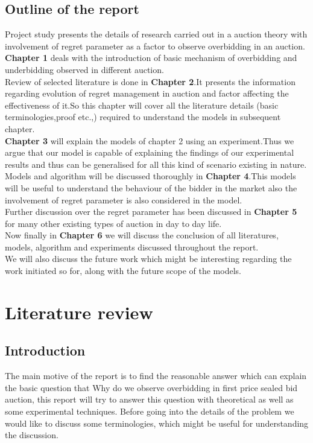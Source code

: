 \documentclass[10pt,a4paper,oneside]{report}
\begin{document}
\section{Outline of the report}
Project study presents the details of research carried out in a auction theory with involvement of regret parameter as a factor to observe overbidding in an auction.\\
\noindent \textbf{Chapter 1} deals with the introduction of basic mechanism of overbidding and underbidding observed in different auction.\\
\noindent Review of selected literature is done in \textbf{Chapter 2}.It presents the information regarding evolution of regret management in auction and factor affecting the effectiveness of it.So this chapter will cover all the literature details (basic terminologies,proof etc.,) required to understand the models in subsequent chapter.\\
\noindent \textbf{Chapter 3} will explain the models of chapter 2 using an experiment.Thus we argue that our model is capable of explaining the findings of our experimental results and thus can be generalised for all this kind of scenario existing in nature.\\
\noindent  Models and algorithm will be discussed thoroughly in \textbf{Chapter 4}.This models will be useful to understand the behaviour of the bidder in the market also the involvement of regret parameter is also considered in the model.\\
\noindent Further discussion over the regret parameter has been discussed in \textbf{Chapter 5} for many other existing types of auction in day to day life.\\
\noindent Now finally in \textbf{Chapter 6} we will discuss the conclusion of all literatures, models, algorithm and experiments discussed throughout the report.\\
\noindent We will also discuss the future work which might be interesting regarding the work initiated so for, along with the future scope of the models.

\chapter{Literature review}
\section{Introduction}
The main motive of the report is to find the reasonable answer which can explain the basic question that Why do we observe overbidding in first price sealed bid auction, this report will try to answer this question with theoretical as well as some experimental techniques. Before going into the details of the problem we would like to discuss some terminologies, which might be useful for understanding the discussion.
\end{document}
